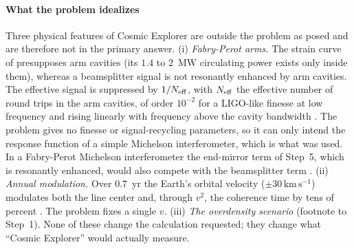 \paragraph*{What the problem idealizes}
Three physical features of Cosmic Explorer are outside the problem as posed and are therefore not in the primary answer. (i) \emph{Fabry-Perot arms.} The strain curve of \citet{Reitze2019} presupposes arm cavities (its $1.4$ to $2$~MW circulating power exists only inside them), whereas a beamsplitter signal is not resonantly enhanced by arm cavities. The effective signal is suppressed by $1/N_{\rm eff}$, with $N_{\rm eff}$ the effective number of round trips in the arm cavities, of order $10^{-2}$ for a LIGO-like finesse at low frequency and rising linearly with frequency above the cavity bandwidth \citep[Eqs.~20 and 21]{GroteStadnik2019}. The problem gives no finesse or signal-recycling parameters, so it can only intend the response function of a simple Michelson interferometer, which is what was used. In a Fabry-Perot Michelson interferometer the end-mirror term of Step~5, which is resonantly enhanced, would also compete with the beamsplitter term \citep{GroteStadnik2019}. (ii) \emph{Annual modulation.} Over $0.7$~yr the Earth's orbital velocity ($\pm30\,\mathrm{km\,s^{-1}}$) modulates both the line center and, through $v^2$, the coherence time by tens of percent \citep{Vermeulen2021,Baxter2021}. The problem fixes a single $v$. (iii) \emph{The overdensity scenario} (footnote to Step~1). None of these change the calculation requested; they change what ``Cosmic Explorer'' would actually measure.

